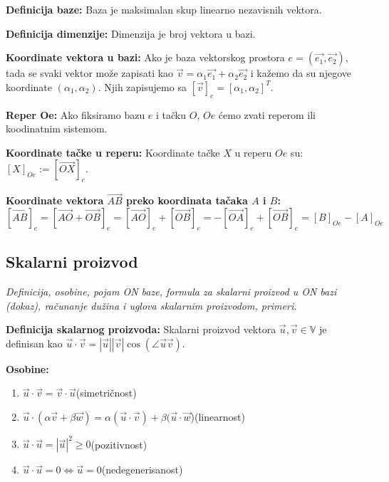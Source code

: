 \documentclass[12pt]{article}
\newcommand{\vek}[1]{\overrightarrow{#1}}
\begin{document}
\textbf{Definicija baze:} Baza je maksimalan skup linearno nezavisnih vektora.
\par

\textbf{Definicija dimenzije:} Dimenzija je broj vektora u bazi.
\par

\textbf{Koordinate vektora u bazi:} Ako je baza vektorskog prostora
$e=(\vek{e_1}, \vek{e_2})$, tada se svaki vektor može zapisati kao
$\vek{v}=\alpha_1\vek{e_1}+\alpha_2\vek{e_2}$ i kažemo da su njegove
koordinate $(\alpha_1, \alpha_2)$. Njih zapisujemo sa
$[\vek{v}]_e=[\alpha_1, \alpha_2]^T$.
\par

\textbf{Reper Oe:} Ako fiksiramo bazu $e$ i tačku $O$, $Oe$ ćemo zvati reperom
ili koodinatnim sistemom.
\par

\textbf{Koordinate tačke u reperu:} Koordinate tačke $X$ u reperu $Oe$ su:
$[X]_{Oe}:=[\vek{OX}]_e$.
\par

\textbf{Koordinate vektora $\vek{AB}$ preko koordinata tačaka $A$ i $B$:}
$$[\vek{AB}]_e=[\vek{AO}+\vek{OB}]_e=[\vek{AO}]_e+[\vek{OB}]_e=
    -[\vek{OA}]_e+[\vek{OB}]_e=[B]_{Oe}-[A]_{Oe}$$


\subsection{Skalarni proizvod}
\textit{Definicija, osobine, pojam ON baze, formula za skalarni proizvod u ON
    bazi (dokaz), računanje dužina i uglova skalarnim proizvodom, primeri.}
\par
\vspace*{1cm}

\textbf{Definicija skalarnog proizvoda:} Skalarni proizvod vektora
$\vek{u},\vek{v}\in\mathbb{V}$ je definisan kao $\vek{u}\cdot\vek{v}=|\vek{u}|
    |\vek{v}|\cos(\angle{\vek{u}\vek{v}})$.
\par

\textbf{Osobine:}
\begin{enumerate}[label=\textbf{(\arabic*)}]
    \item $\vek{u}\cdot\vek{v}=\vek{v}\cdot\vek{u}$\hspace*{1cm}(simetričnost)
    \item $\vek{u}\cdot(\alpha\vek{v}+\beta\vek{w})=\alpha(\vek{u}\cdot\vek{v})
          +\beta(\vek{u}\cdot\vek{w}$)\hspace*{1cm}(linearnost)
    \item $\vek{u}\cdot\vek{u}=|\vek{u}|^2\geq0$\hspace*{1cm}(pozitivnost)
    \item $\vek{u}\cdot\vek{u}=0\iff\vek{u}=0$\hspace*{1cm}(nedegenerisanost)
\end{enumerate}
\par
\end{document}

